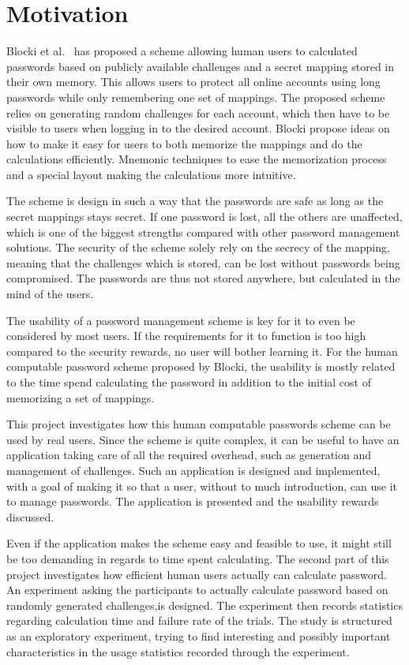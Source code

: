 \section{Motivation}
Blocki et al.~\cite{Blocki2014,hcp-blocki} has proposed a scheme allowing human users to calculated passwords based on publicly available challenges and a secret mapping stored in their own memory. This allows users to protect all online accounts using long passwords while only remembering one set of mappings. The proposed scheme relies on generating random challenges for each account, which then have to be visible to users when logging in to the desired account. Blocki propose ideas on how to make it easy for users to both memorize the mappings and do the calculations efficiently. Mnemonic techniques to ease the memorization process and a special layout making the calculations more intuitive.
\par The scheme is design in such a way that the passwords are safe as long as the secret mappings stays secret. If one password is lost, all the others are unaffected, which is one of the biggest strengths compared with other password management solutions. The security of the scheme solely rely on the secrecy of the mapping, meaning that the challenges which is stored, can be lost without passwords being compromised. The passwords are thus not stored anywhere, but calculated in the mind of the users. 
\par The usability of a password management scheme is key for it to even be considered by most users. If the requirements for it to function is too high compared to the security rewards, no user will bother learning it. For the human computable password scheme proposed by Blocki, the usability is mostly related to the time spend calculating the password in addition to the initial cost of memorizing a set of mappings.
\par This project investigates how this human computable passwords scheme can be used by real users. Since the scheme is quite complex, it can be useful to have an application taking care of all the required overhead, such as generation and management of challenges. Such an application is designed and implemented, with a goal of making it so that a user, without to much introduction, can use it to manage passwords. The application is presented and the usability rewards discussed.
\par Even if the application makes the scheme easy and feasible to use, it might still be too demanding in regards to time spent calculating. The second part of this project investigates how efficient human users actually can calculate password. An experiment asking the participants to actually calculate password based on randomly generated challenges,is designed. The experiment then records statistics regarding calculation time and failure rate of the trials. The study is structured as an exploratory experiment, trying to find interesting and possibly important characteristics in the usage statistics recorded through the experiment.

